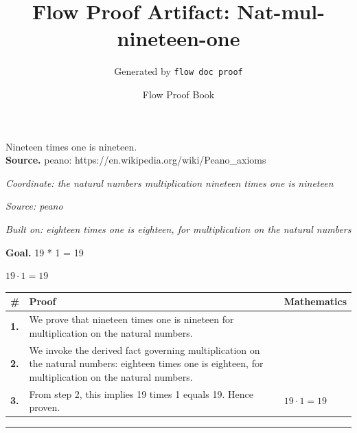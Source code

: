 \documentclass[11pt]{article}
\title{Flow Proof Artifact: Nat-mul-nineteen-one}
\author{Generated by \texttt{flow doc proof}}
\date{Flow Proof Book}
\theoremstyle{definition}
\begin{document}
\maketitle
Nineteen times one is nineteen.\\[0.5em]
\textbf{Source.} peano: https://en.wikipedia.org/wiki/Peano\_axioms\\[0.5em]
\bigskip
{}\par
\smallskip\noindent\textit{Coordinate: the natural numbers \cdot multiplication \cdot nineteen times one is nineteen}\par
\smallskip\noindent\textit{Source: peano}\par
\smallskip\noindent\textit{Built on: eighteen times one is eighteen, for multiplication on the natural numbers}\par
\medskip
\noindent\textbf{Goal.} 19 * 1 = 19\par
\noindent$\displaystyle 19 \cdot 1 = 19$\par
\medskip
\noindent
\begin{tabular}{@{} >{\raggedright\arraybackslash}p{} >{\raggedright\arraybackslash}p{} >{\raggedleft\arraybackslash}p{} @{}}
\textbf{\#} & \textbf{Proof} & \textbf{Mathematics} \\
\midrule
\textbf{1.} & We prove that nineteen times one is nineteen for multiplication on the natural numbers. & \\[0.45em]
\textbf{2.} & We invoke the derived fact governing multiplication on the natural numbers: eighteen times one is eighteen, for multiplication on the natural numbers. & \\[0.45em]
\textbf{3.} & From step 2, this implies 19 times 1 equals 19. Hence proven. & $\displaystyle 19 \cdot 1 = 19$ \\[0.45em]
\bottomrule
\end{tabular}
\label{thm:Nat-multiplication-nineteen_times_one_is_nineteen}
\par\medskip\hrule
\end{document}
